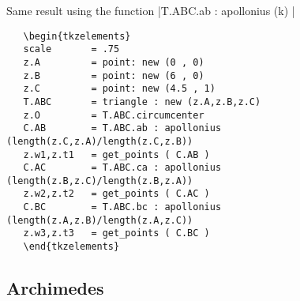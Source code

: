 \hspace*{\fill}
\hspace*{\fill}

Same result using the function |T.ABC.ab : apollonius (k) |

\begin{verbatim}
   \begin{tkzelements}
   scale       = .75
   z.A         = point: new (0 , 0)
   z.B         = point: new (6 , 0)
   z.C         = point: new (4.5 , 1)
   T.ABC       = triangle : new (z.A,z.B,z.C)
   z.O         = T.ABC.circumcenter
   C.AB        = T.ABC.ab : apollonius (length(z.C,z.A)/length(z.C,z.B))
   z.w1,z.t1   = get_points ( C.AB )
   C.AC        = T.ABC.ca : apollonius (length(z.B,z.C)/length(z.B,z.A))
   z.w2,z.t2   = get_points ( C.AC )
   C.BC        = T.ABC.bc : apollonius (length(z.A,z.B)/length(z.A,z.C))
   z.w3,z.t3   = get_points ( C.BC )
   \end{tkzelements}
\end{verbatim}


\subsection{Archimedes} %
\label{sub:archimedes}

